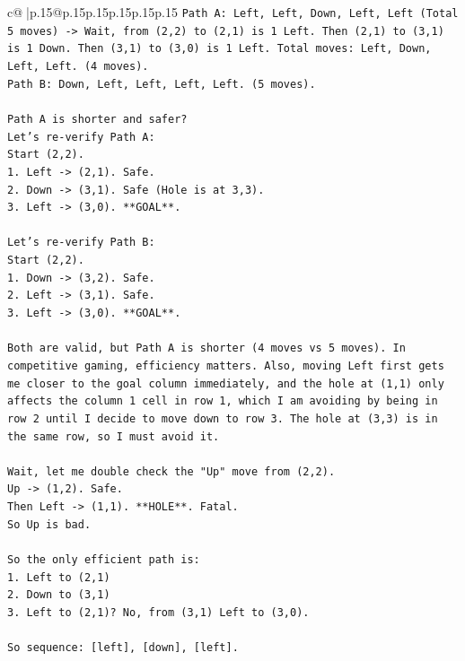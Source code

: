\documentclass{article}
\begin{document}
{\begin{supertabular}{c@{$\;$}|p{.15\linewidth}@{}p{.15\linewidth}p{.15\linewidth}p{.15\linewidth}p{.15\linewidth}p{.15\linewidth}}
{{{\texttt{Path A: Left, Left, Down, Left, Left (Total 5 moves) {-}> Wait, from (2,2) to (2,1) is 1 Left. Then (2,1) to (3,1) is 1 Down. Then (3,1) to (3,0) is 1 Left. Total moves: Left, Down, Left, Left. (4 moves).} \\
\texttt{Path B: Down, Left, Left, Left, Left. (5 moves).} \\
\\ 
\texttt{Path A is shorter and safer?} \\
\texttt{Let's re{-}verify Path A:} \\
\texttt{Start (2,2).} \\
\texttt{1. Left {-}> (2,1). Safe.} \\
\texttt{2. Down {-}> (3,1). Safe (Hole is at 3,3).} \\
\texttt{3. Left {-}> (3,0). **GOAL**.} \\
\\ 
\texttt{Let's re{-}verify Path B:} \\
\texttt{Start (2,2).} \\
\texttt{1. Down {-}> (3,2). Safe.} \\
\texttt{2. Left {-}> (3,1). Safe.} \\
\texttt{3. Left {-}> (3,0). **GOAL**.} \\
\\ 
\texttt{Both are valid, but Path A is shorter (4 moves vs 5 moves). In competitive gaming, efficiency matters. Also, moving Left first gets me closer to the goal column immediately, and the hole at (1,1) only affects the column 1 cell in row 1, which I am avoiding by being in row 2 until I decide to move down to row 3. The hole at (3,3) is in the same row, so I must avoid it.} \\
\\ 
\texttt{Wait, let me double check the "Up" move from (2,2).} \\
\texttt{Up {-}> (1,2). Safe.} \\
\texttt{Then Left {-}> (1,1). **HOLE**. Fatal.} \\
\texttt{So Up is bad.} \\
\\ 
\texttt{So the only efficient path is:} \\
\texttt{1. Left to (2,1)} \\
\texttt{2. Down to (3,1)} \\
\texttt{3. Left to (2,1)? No, from (3,1) Left to (3,0).} \\
\\ 
\texttt{So sequence: {[}left{]}, {[}down{]}, {[}left{]}.} \\
}}}
\end{supertabular}}
\end{document}
